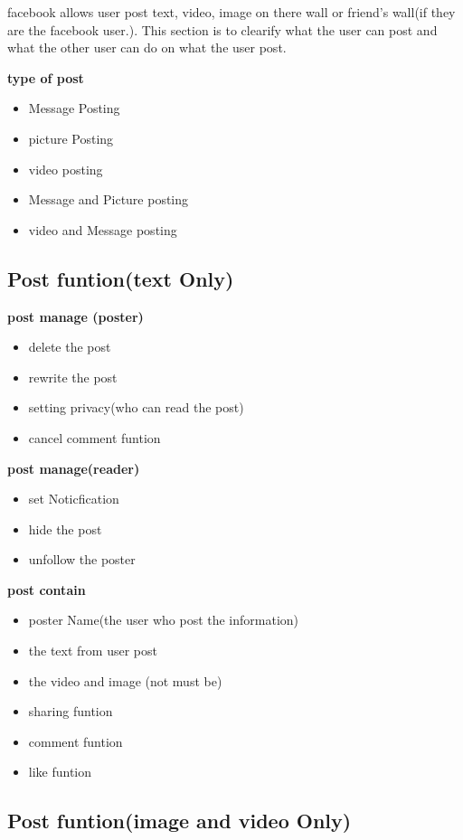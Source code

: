 facebook allows user post text, video, image on there wall or friend's wall(if
they are the facebook user.). This section is to clearify what the user can post
and what the other user can do on what the user post.


\textbf{type of post}
\begin{itemize}
\item Message Posting 
\item picture Posting
\item video posting
\item Message and Picture posting
\item video and Message posting
\end{itemize}


\subsection{Post funtion(text Only)}

\textbf{post manage (poster)}
\begin{itemize}
\item delete the post
\item rewrite the post
\item setting privacy(who can read the post)
\item cancel comment funtion
\end{itemize}

\textbf{post manage(reader)}
\begin{itemize}
\item set Noticfication
\item hide the post 
\item unfollow the poster
\end{itemize}

\textbf{post contain}
\begin{itemize}
\item poster Name(the user who post the information)
\item the text from user post
\item the video and image (not must be)
\item sharing funtion
\item comment funtion
\item like funtion
\end{itemize}


\subsection{Post funtion(image and video Only)}

